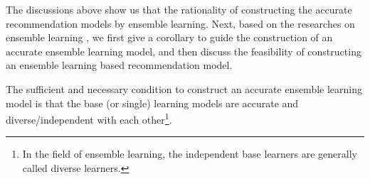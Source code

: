 \documentclass[prodmode,acmtkdd]{acmsmall}
\begin{document}
The discussions above show us that the rationality of constructing
the accurate recommendation models by ensemble learning. Next, based
on the researches on ensemble learning
\cite{dietterichl2002ensemble,hansen1990neural}, we first give a
corollary to guide the construction of an accurate ensemble learning
model, and then discuss the feasibility of constructing an ensemble
learning based recommendation model.
\begin{corollary}\label{coro:condition}
The sufficient and necessary condition to construct an accurate
ensemble learning model is that the base (or single) learning models
are accurate and diverse/independent with each other\footnote{In the
field of ensemble learning, the independent base learners are
generally called diverse learners.}.
\end{corollary}
\end{document}
